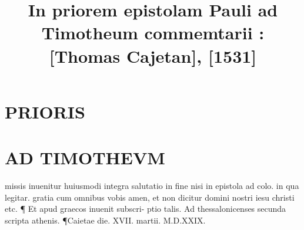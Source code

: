 \documentclass{article}
\begin{document}
\date{}
        \title{In priorem epistolam Pauli ad Timotheum commemtarii : [Thomas Cajetan], [1531]}
\maketitle
\tableofcontents
\clearpage
\begin{pages} 
\beginnumbering
        
\section*{PRIORIS }
\section*{AD TIMOTHEVM }\pstart missis inuenitur huiusmodi integra salutatio in fine nisi in epistola ad colo. in qua legitar. gratia cum omnibus vobis amen, et non dicitur domini nostri iesu christi etc. ¶ Et apud graecos inuenit subscri- ptio talis. Ad thessalonicenses secunda scripta athenis. ¶Caietae die. XVII. martii. M.D.XXIX.  \pend
{}
{}

\end{pages}
\end{document}
